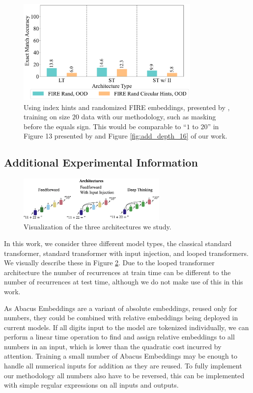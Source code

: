 \documentclass{article}
\begin{document}
\begin{figure}[ht!]
    \centering
    \includegraphics[width=0.8\textwidth]{Figures/plot_ten_2_bars.pdf}
    \caption{
    Using index hints and randomized FIRE embeddings, presented by \citet{zhou2024transformers}, training on size \(20\) data with our methodology, such as masking before the equals sign.
    This would be comparable to ``\(1\) to \(20\)'' in Figure 13 presented by \citet{zhou2024transformers} and Figure \ref{fig:add_depth_16} of our work.
    }
    \label{fig:app_index_hints}
\end{figure}

\subsection{Additional Experimental Information}
\label{app-subsec:set-up}
\begin{figure}[ht!] %
    \centering
    \includegraphics[width=0.65\textwidth]{Figures/architectures.001.png}
    \caption{
    Visualization of the three architectures we study.
    }
    \label{fig:models}
\end{figure}

In this work, we consider three different model types, the classical standard  transformer, standard transformer with input injection, and looped transformers.
We visually describe these in Figure \ref{fig:models}.
Due to the looped transformer architecture the number of recurrences at train time can be different to the number of recurrences at test time, although we do not make use of this in this work.

As Abacus Embeddings are a variant of absolute embeddings, reused only for numbers, they could be combined with relative embeddings being deployed in current models.
If all digits input to the model are tokenized individually, we can perform a linear time operation to find and assign relative embeddings to all numbers in an input, which is lower than the quadratic cost incurred by attention.
Training a small number of Abacus Embeddings may be enough to handle all numerical inputs for addition as they are reused.
To fully implement our methodology all numbers also have to be reversed, this can be implemented with simple regular expressions on all inputs and outputs.
\end{document}
